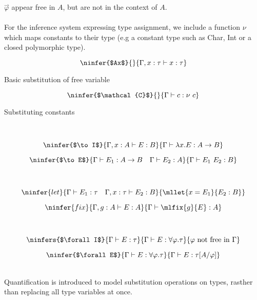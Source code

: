 $\overset{\rightharpoonup}{\varphi}$ appear free in $A$, but are not in the context of $A$.
\\
\\ For the inference system expressing type assignment, we include a function $\nu$ which maps constants to their type (e.g a constant type such as Char, Int or a closed polymorphic type).
\\ \begin{minipage}[b]{.5\textwidth}
	\[\ninfer{$Ax$}{}{\Gamma, x:\tau \vdash x : \tau}\]
	\centerline{Basic substitution of free variable}
\end{minipage}
\begin{minipage}[b]{.5\textwidth}
	\[\ninfer{$\mathcal{C}$}{}{\Gamma \vdash c : \nu \ c}\]
	\centerline{Substituting constants}
\end{minipage}
\vspace{2mm}
\\ \begin{minipage}[b]{.5\textwidth}
	\[\ninfer{$\to I$}{\Gamma, x:A \vdash E : B}{\Gamma \vdash \lambda x . E : A \to B}\]
\end{minipage}
\begin{minipage}[b]{.5\textwidth}
	\[\ninfer{$\to E$}{\Gamma \vdash E_1 : A \to B \quad \Gamma \vdash E_2 : A}{\Gamma \vdash E_1 \ E_2 : B}\]
\end{minipage}
\vspace{2mm}
\\ \begin{minipage}[b]{.5\textwidth}
	\[\ninfer{let}{\Gamma \vdash E_1 : \tau \quad \Gamma, x: \tau \vdash E_2 : B}{\mllet{x = E_1}{E_2 : B}}\]
\end{minipage}
\begin{minipage}[b]{.5\textwidth}
	\[\ninfer{fix}{\Gamma, g:A \vdash E : A}{\Gamma \vdash \mlfix{g}{E} : A}\]
\end{minipage}
\vspace{2mm}
\\ \begin{minipage}[b]{.5\textwidth}
	\[\ninfers{$\forall I$}{\Gamma \vdash E : \tau}{\Gamma \vdash E : \forall \varphi . \tau}{\varphi \text{ not free in } \Gamma}  \]
\end{minipage}
\begin{minipage}[b]{.5\textwidth}
	\[\ninfer{$\forall E$}{\Gamma \vdash E : \forall \varphi . \tau}{\Gamma \vdash E : \tau [A / \varphi]}\]
\end{minipage}
\vspace{5mm}
\\ Quantification is introduced to model substitution operations on types, rasther than replacing all type variables at once.
